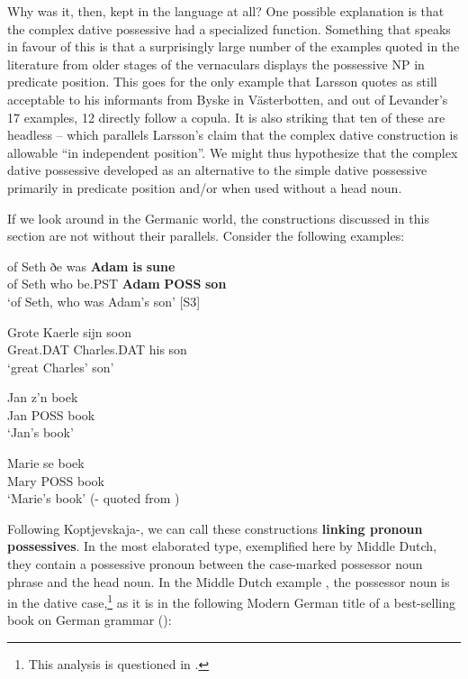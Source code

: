Why was it, then, kept in the language at all? One possible explanation is that the complex dative possessive had a specialized function. Something that speaks in favour of this is that a surprisingly large number of the examples quoted in the literature from older stages of the vernaculars displays the possessive NP in predicate position. This goes for the only example that Larsson quotes as still acceptable to his informants from Byske in Västerbotten, and out of Levander’s 17 examples, 12 directly follow a copula. It is also striking that ten of these are headless – which parallels Larsson’s claim that the complex dative construction is allowable “in independent position”. We might thus hypothesize that the complex dative possessive developed as an alternative to the simple dative possessive primarily in predicate position and/or when used without a head noun. 

If we look around in the Germanic world, the constructions discussed in this section are not without their parallels. Consider the following examples: 

\ea\label{}
\gll of  Seth  ðe  was  \textbf{Adam} \textbf{is} \textbf{sune}\\
of  Seth  who  be.PST  \textbf{Adam} \textbf{POSS} \textbf{son}\\
\glt ‘of Seth, who was Adam’s son’ [S3]
\z

\ea\label{}
\gll Grote  Kaerle  sijn  soon\\
Great.DAT  Charles.DAT  his  son\\
\glt ‘great Charles’ son’
\z

\ea\label{}
\gll Jan  z’n  boek\\
Jan  POSS   book\\
\glt ‘Jan’s book’
\z

\ea\label{}
\gll Marie  se  boek\\
Mary  POSS  book\\
\glt ‘Marie’s book’ (- quoted from \citet[56]{Norde1997})
\z

Following Koptjevskaja-\citet{Tamm2003}, we can call these constructions \textbf{linking pronoun possessives}. In the most elaborated type, exemplified here by Middle Dutch, they contain a possessive pronoun between the case-marked possessor noun phrase and the head noun. In the Middle Dutch example , the possessor noun is in the dative case,\footnote{ This analysis is questioned in \citet{Allen2008}.} as it is in the following Modern German title of a best-selling book on German grammar (\citet{Sick2004}):


